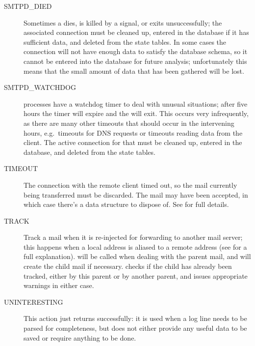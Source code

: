 \begin{description}
    \item [SMTPD\_DIED] Sometimes a  dies, is killed by a
        signal, or exits unsuccessfully; the associated connection must be
        cleaned up, entered in the database if it has sufficient data, and
        deleted from the state tables.  In some cases the connection will
        not have enough data to satisfy the database schema, so it cannot
        be entered into the database for future analysis; unfortunately
        this means that the small amount of data that has been gathered
        will be lost.

    \item [SMTPD\_WATCHDOG]  processes have a watchdog timer
        to deal with unusual situations; after five hours the timer will
        expire and the  will exit.  This occurs very
        infrequently, as there are many other timeouts that should occur in
        the intervening hours, e.g.\ timeouts for DNS requests or timeouts
        reading data from the client.  The active connection for that
         must be cleaned up, entered in the database, and
        deleted from the state tables.

    \item [TIMEOUT] The connection with the remote client timed out, so the
        mail currently being transferred must be discarded.  The mail may
        have been accepted, in which case there's a data structure to
        dispose of.  See  for full
        details.

    \item [TRACK] Track a mail when it is re-injected for forwarding to
        another mail server; this happens when a local address is aliased
        to a remote address (see  for
        a full explanation).   will be called when dealing
        with the parent mail, and will create the child mail if necessary.
         checks if the child has already been tracked, either
        by this parent or by another parent, and issues appropriate
        warnings in either case.

    \item [UNINTERESTING] This action just returns successfully: it is used
        when a log line needs to be parsed for completeness, but does not
        either provide any useful data to be saved or require anything to
        be done.

\end{description}


